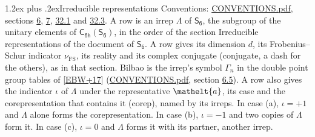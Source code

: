 \documentclass[10pt,a4paper]{article}
\makeatletter
\renewcommand\section{\@startsection{section}{1}{\z@}{-3ex plus -1ex minus -.2ex}%
  {1.2ex plus .2ex}{\normalfont\large\sffamily\bfseries\color{parttitle}}}
\numberwithin{equation}{section}
\newcommand{\eltfont}[1]{{\let\sigma\eltsigma\mathelt{#1}}}
\newcommand{\grp}[1]{\mathsf{#1}}
\newcommand{\elt}[1]{\eltfont{#1}}
\newcommand{\fsind}{\nu_{\mathrm{FS}}}
\makeatother
\begin{document}
\section{Irreducible representations}\label{s:irreps}
Conventions: \href{../../CONVENTIONS.pdf}{CONVENTIONS.pdf}, sections \href{../../../rotation/CONVENTIONS.pdf\#conv.6}{6}, \href{../../../rotation/CONVENTIONS.pdf\#conv.7}{7}, \href{../../CONVENTIONS.pdf\#conv.32.1}{32.1} and \href{../../CONVENTIONS.pdf\#conv.32.3}{32.3}.
\leavevmode\label{n:irrep.Delta}A row is an irrep $\Lambda$ of $\grp{S_{6}}$, the subgroup of the unitary elements of $\grp{C_{6h}}(\grp{S_{6}})$, in the order of the section Irreducible representations of the document of \href{../../../rotation/data/pdf/S6.pdf}{$\grp{S_{6}}$}. \label{n:index.dimension}\label{n:index.frobenius}\label{n:head.irrep}\label{n:head.reality}\label{n:head.conjugate}A row gives its dimension $d$, its Frobenius--Schur indicator $\fsind$, its reality and its complex conjugate (conjugate, a dash for the others), as in that section. \label{n:head.bilbao}\label{n:irrep.alias.gamma}Bilbao is the irrep's symbol $\Gamma_n$ in the double point group tables of [\href{../../../REFERENCES.pdf\#ref.EBW+17}{EBW+17}] (\href{../../CONVENTIONS.pdf}{CONVENTIONS.pdf}, section \href{../../../rotation/CONVENTIONS.pdf\#conv.6.5}{6.5}). \label{n:head.case.corep}\label{n:head.corep}A row also gives the indicator $\iota$ of $\Lambda$ under the representative $\elt{a}$, its case and the corepresentation that contains it (corep), named by its irreps. In case (a), $\iota = +1$ and $\Lambda$ alone forms the corepresentation. In case (b), $\iota = -1$ and two copies of $\Lambda$ form it. In case (c), $\iota = 0$ and $\Lambda$ forms it with its partner, another irrep.
\setlength{\emergencystretch}{2em}\par\setlength{\emergencystretch}{0pt}
\end{document}
